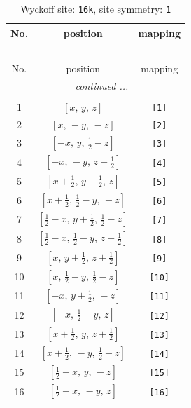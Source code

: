 \documentclass[fleqn,8pt]{jsarticle}
\begin{document}
\begin{longtable}{ccc}
\caption{Wyckoff site: {\tt 16k}, site symmetry: {\tt 1}}
 \\
 \hline \hline
No. & position & mapping \\ \hline \endfirsthead

\multicolumn{2}{l}{\tablename\ \thetable{}} \\
 \hline \hline
No. & position & mapping \\ \hline \endhead

 \hline \hline
\multicolumn{2}{r}{\footnotesize\it continued ...} \\ \endfoot

 \hline \hline
\multicolumn{2}{r}{} \\ \endlastfoot

1 & $\left[ x,\, y,\, z \right]$ & {\tt [1]} \\ \hline
2 & $\left[ x,\, - y,\, - z \right]$ & {\tt [2]} \\ \hline
3 & $\left[ - x,\, y,\, \frac{1}{2} - z \right]$ & {\tt [3]} \\ \hline
4 & $\left[ - x,\, - y,\, z + \frac{1}{2} \right]$ & {\tt [4]} \\ \hline
5 & $\left[ x + \frac{1}{2},\, y + \frac{1}{2},\, z \right]$ & {\tt [5]} \\ \hline
6 & $\left[ x + \frac{1}{2},\, \frac{1}{2} - y,\, - z \right]$ & {\tt [6]} \\ \hline
7 & $\left[ \frac{1}{2} - x,\, y + \frac{1}{2},\, \frac{1}{2} - z \right]$ & {\tt [7]} \\ \hline
8 & $\left[ \frac{1}{2} - x,\, \frac{1}{2} - y,\, z + \frac{1}{2} \right]$ & {\tt [8]} \\ \hline
9 & $\left[ x,\, y + \frac{1}{2},\, z + \frac{1}{2} \right]$ & {\tt [9]} \\ \hline
10 & $\left[ x,\, \frac{1}{2} - y,\, \frac{1}{2} - z \right]$ & {\tt [10]} \\ \hline
11 & $\left[ - x,\, y + \frac{1}{2},\, - z \right]$ & {\tt [11]} \\ \hline
12 & $\left[ - x,\, \frac{1}{2} - y,\, z \right]$ & {\tt [12]} \\ \hline
13 & $\left[ x + \frac{1}{2},\, y,\, z + \frac{1}{2} \right]$ & {\tt [13]} \\ \hline
14 & $\left[ x + \frac{1}{2},\, - y,\, \frac{1}{2} - z \right]$ & {\tt [14]} \\ \hline
15 & $\left[ \frac{1}{2} - x,\, y,\, - z \right]$ & {\tt [15]} \\ \hline
16 & $\left[ \frac{1}{2} - x,\, - y,\, z \right]$ & {\tt [16]} \\
\end{longtable}
\end{document}
